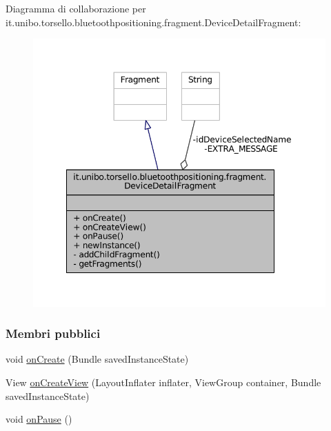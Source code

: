 Diagramma di collaborazione per it.\+unibo.\+torsello.\+bluetoothpositioning.\+fragment.\+Device\+Detail\+Fragment\+:
\nopagebreak
\begin{figure}[H]
\begin{center}
\leavevmode
\includegraphics[width=349pt]{classit_1_1unibo_1_1torsello_1_1bluetoothpositioning_1_1fragment_1_1DeviceDetailFragment__coll__graph}
\end{center}
\end{figure}
\subsubsection*{Membri pubblici}
\begin{DoxyCompactItemize}
\item 
void \hyperlink{classit_1_1unibo_1_1torsello_1_1bluetoothpositioning_1_1fragment_1_1DeviceDetailFragment_af33d782c107be10fe752f16f04cc5e5d_af33d782c107be10fe752f16f04cc5e5d}{on\+Create} (Bundle saved\+Instance\+State)
\item 
View \hyperlink{classit_1_1unibo_1_1torsello_1_1bluetoothpositioning_1_1fragment_1_1DeviceDetailFragment_a6d43be281b577e0d9f2540fea30c2fdf_a6d43be281b577e0d9f2540fea30c2fdf}{on\+Create\+View} (Layout\+Inflater inflater, View\+Group container, Bundle saved\+Instance\+State)
\item 
void \hyperlink{classit_1_1unibo_1_1torsello_1_1bluetoothpositioning_1_1fragment_1_1DeviceDetailFragment_a1ed4762356dd3067ce48aa73da50404e_a1ed4762356dd3067ce48aa73da50404e}{on\+Pause} ()
\end{DoxyCompactItemize}
